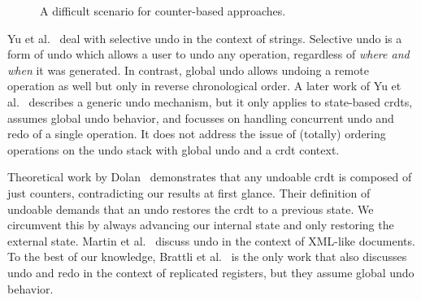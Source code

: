 \documentclass[sigplan]{acmart}
\begin{document}
\begin{figure}
\caption{
  A difficult scenario for counter-based approaches.
}\label{fig:anti-counter}
\end{figure}

Yu et al.~\cite{Yu2015undo} deal with selective undo in the context of strings.
Selective undo is a form of undo which allows a user to undo any operation,
regardless of \emph{where and when} it was generated.
In contrast, global undo allows undoing a remote operation as well
but only in reverse chronological order.
A later work of Yu et al.~\cite{Yu2019undo} describes a generic undo mechanism,
but it only applies to state-based \glspl*{crdt}, assumes global undo
behavior, and focusses on handling concurrent undo and redo of a single operation.
It does not address the issue of (totally) ordering operations on the undo stack
with global undo and a \gls{crdt} context.

Theoretical work by Dolan~\cite{Dolan2020undoable} demonstrates
that any undoable \gls{crdt} is composed of just counters, contradicting our
results at first glance.
Their definition of undoable demands that an undo restores the \gls{crdt}
to a previous state.
We circumvent this by always advancing our internal state and only restoring
the external state.
Martin et al.~\cite{Martin2010xml} discuss undo in the context of XML-like documents.
To the best of our knowledge, Brattli et al.~\cite{Brattli2021undo} is the
only work that also discusses undo and redo in the context of replicated registers,
but they assume global undo behavior.
\end{document}
